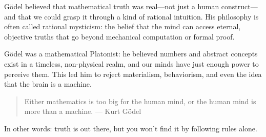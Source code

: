 \begin{tcolorbox}[title=Historical Sidebar: \textit{Will Work for Beer}, colback=gray!5, colframe=black, fonttitle=\bfseries]

  Gödel believed that mathematical truth was real—not just a human construct—and that we could grasp it through a kind of rational intuition. His philosophy is often called rational mysticism: the belief that the mind can access eternal, objective truths that go beyond mechanical computation or formal proof.

  \medskip

  Gödel was a mathematical Platonist: he believed numbers and abstract concepts exist in a timeless, non-physical realm, and our minds have just enough power to perceive them. This led him to reject materialism, behaviorism, and even the idea that the brain is a machine.
  
  \begin{quote}
    Either mathematics is too big for the human mind, or the human mind is more than a machine.  ---  Kurt Gödel
  \end{quote}
  
  In other words: truth is out there, but you won’t find it by following rules alone.
  
\end{tcolorbox}
  


